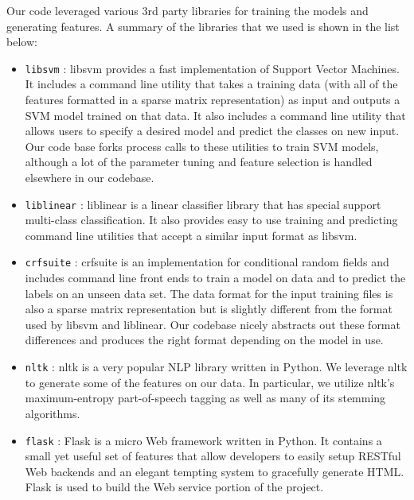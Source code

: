 \documentclass[preprint]{style}
\begin{document}
Our code leveraged various 3rd party libraries for training the models and generating features. A summary of the libraries that we used is shown in the list below:

\begin{itemize}

\item {\tt libsvm} \cite{libsvm}: libsvm provides a fast implementation of Support Vector Machines. It includes a command line utility that takes a training data (with all of the features formatted in a sparse matrix representation) as input and outputs a SVM model trained on that data. It also includes a command line utility that allows users to specify a desired model and predict the classes on new input. Our code base forks process calls to these utilities to train SVM models, although a lot of the parameter tuning and feature selection is handled elsewhere in our codebase.

\item {\tt liblinear} \cite{liblinear}: liblinear is a linear classifier library that has special support multi-class classification. It also provides easy to use training and predicting command line utilities that accept a similar input format as libsvm.

\item {\tt crfsuite} \cite{crfsuite}: crfsuite is an implementation for conditional random fields and includes command line front ends to train a model on data and to predict the labels on an unseen data set. The data format for the input training files is also a sparse matrix representation but is slightly different from the format used by libsvm and liblinear. Our codebase nicely abstracts out these format differences and produces the right format depending on the model in use.

\item {\tt nltk} \cite{nltk}: nltk is a very popular NLP library written in Python. We leverage nltk to generate some of the features on our data. In particular, we utilize nltk's maximum-entropy part-of-speech tagging as well as many of its stemming algorithms.

\item {\tt flask} \cite{flask}: Flask is a micro Web framework written in Python. It contains a small yet useful set of features that allow developers to easily setup RESTful Web backends and an elegant tempting system to gracefully generate HTML. Flask is used to build the Web service portion of the project.

\end{itemize}
	
\end{document}
